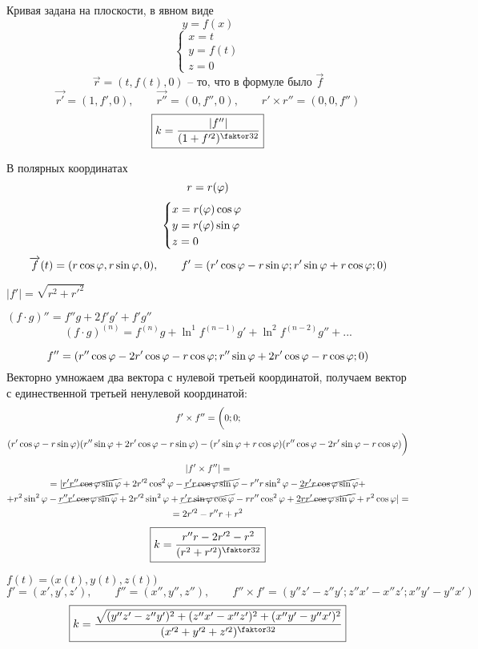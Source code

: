 \begin{exmpls}
	\item Кривая задана на плоскости, в явном виде
	$$ y = f(x) $$
	$$
	\begin{cases}
		x = t \\
		y = f(t) \\
		z = 0
	\end{cases} $$
	$$ \vec{r} = (t, f(t), 0) \text{ -- то, что в формуле было } \vec{f} $$
	$$ \vec{r'} = (1, f', 0), \qquad \vec{r''} = (0, f'', 0), \qquad r' \times r'' = (0, 0, f'') $$
	$$ \boxed{k = \frac{|f''|}{(1 + f'^2)^{\faktor32}}} $$
	\item В полярных координатах
	$$ r = r(\varphi) $$
	$$
	\begin{cases}
		x = r(\varphi)\cos\varphi \\
		y = r(\varphi)\sin\varphi \\
		z = 0
	\end{cases} $$
	$$ \overrightarrow{f}(t) = (r\cos\varphi, r\sin\varphi, 0), \qquad f' = (r'\cos\varphi - r\sin\varphi; r'\sin\varphi + r\cos\varphi; 0) $$
	\begin{remind}
		$ |f'| = \sqrt{r^2 + r'^2} $
	\end{remind}
	\begin{remind}
		$ (f \cdot g)'' = f''g + 2f'g' + f'g'' $
		$$ (f \cdot g)^{(n)} = f^{(n)}g + \ln^1 f^{(n - 1)}g' + \ln^2 f^{(n - 2)}g'' + ... $$
	\end{remind}
	$$ f'' = (r''\cos \varphi - 2r'\cos\varphi - r\cos\varphi; r''\sin\varphi + 2r'\cos\varphi - r\cos\varphi; 0) $$
	Векторно умножаем два вектора с нулевой третьей координатой, получаем вектор с единественной третьей ненулевой координатой:
	\begin{multline*}
		f' \times f'' = \bigg( 0; 0; \\
		(r'\cos\varphi - r\sin\varphi)(r''\sin\varphi + 2r'\cos\varphi - r\sin\varphi) - (r'\sin\varphi + r\cos\varphi)(r''\cos\varphi - 2r'\sin\varphi - r\cos\varphi)\bigg)
	\end{multline*}
	\begin{multline*}
		|f' \times f''| = \\
		= |\cancel{r'r''\cos\varphi\sin\varphi} + 2r'^2\cos^2\varphi - \cancel{r'r\cos\varphi\sin\varphi} - r''r\sin^2\varphi - \cancel{2r'r\cos\varphi\sin\varphi} + \\
		+ r^2\sin^2\varphi - \cancel{r''r'\cos\varphi\sin\varphi} + 2r'^2\sin^2\varphi + \cancel{r'r\sin\varphi\cos\varphi} - rr''\cos^2\varphi + \cancel{2rr'\cos\varphi\sin\varphi} + r^2\cos\varphi| = \\
		= 2r'^2 - r''r + r^2
	\end{multline*}
	$$ \boxed{k = \frac{r''r - 2r'^2 - r^2}{(r^2 + r'^2)^{\faktor32}}} $$
	\item $ f(t) = \bigg(x(t), y(t), z(t) \bigg) $
	$$ f' = (x', y', z'), \qquad f'' = (x'', y'', z''), \qquad f'' \times f' = (y''z' - z''y'; z''x' - x''z'; x''y' - y''x') $$
	$$ \boxed{k =\frac{\sqrt{(y''z' - z''y')^2 + (z''x' - x''z')^2 + (x''y' - y''x')^2}}{(x'^2 + y'^2 + z'^2)^{\faktor32}}} $$
\end{exmpls}

